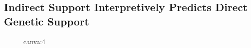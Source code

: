 \subsection{Indirect Support Interpretively Predicts Direct Genetic Support}








\begin{figure}[t!]
    \centering
    {{canva:4}}
    \caption{}
    \label{fig:validation-genetics}
\end{figure}

